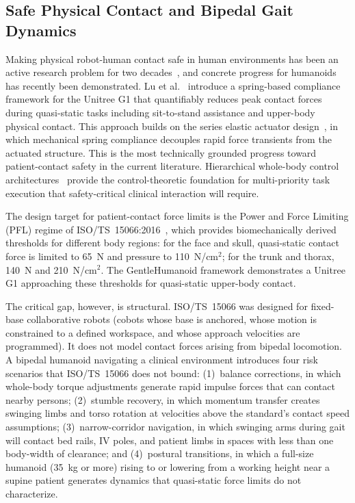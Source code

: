 \documentclass[acmsmall]{acmart}
\begin{document}
\subsection{Safe Physical Contact and Bipedal Gait Dynamics}
\label{sec:safety}

Making physical robot-human contact safe in human environments has been an
active research problem for two decades~\cite{alami2006safe}, and concrete
progress for humanoids has recently been demonstrated. Lu et
al.~\cite{lu2025gentlehumanoid} introduce a spring-based compliance framework for
the Unitree G1 that quantifiably reduces peak contact forces during quasi-static
tasks including sit-to-stand assistance and upper-body physical contact. This
approach builds on the series elastic actuator design~\cite{pratt1995elastic},
in which mechanical spring compliance decouples rapid force transients from the
actuated structure. This is the most technically grounded progress toward
patient-contact safety in the current literature. Hierarchical whole-body control
architectures~\cite{sentis2005synthesis} provide the control-theoretic foundation
for multi-priority task execution that safety-critical clinical interaction will
require.

The design target for patient-contact force limits is the Power and Force
Limiting (PFL) regime of ISO/TS~15066:2016~\cite{isots15066}, which provides
biomechanically derived thresholds for different body regions: for the face and skull, quasi-static
contact force is limited to 65~N and pressure to 110~N/cm$^2$; for the trunk and
thorax, 140~N and 210~N/cm$^2$. The GentleHumanoid framework demonstrates a
Unitree G1 approaching these thresholds for quasi-static upper-body contact.

The critical gap, however, is structural. ISO/TS~15066 was designed for
fixed-base collaborative robots (cobots whose base is anchored, whose motion is
constrained to a defined workspace, and whose approach velocities are programmed).
It does not model contact forces arising from bipedal locomotion. A bipedal
humanoid navigating a clinical environment introduces four risk scenarios that
ISO/TS~15066 does not bound: (1)~balance corrections, in which whole-body torque
adjustments generate rapid impulse forces that can contact nearby persons;
(2)~stumble recovery, in which momentum transfer creates swinging limbs and torso
rotation at velocities above the standard's contact speed assumptions;
(3)~narrow-corridor navigation, in which swinging arms during gait will contact
bed rails, IV poles, and patient limbs in spaces with less than one body-width of
clearance; and (4)~postural transitions, in which a full-size humanoid (35~kg or
more) rising to or lowering from a working height near a supine patient generates
dynamics that quasi-static force limits do not characterize.
\end{document}
